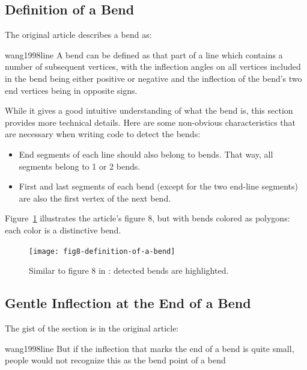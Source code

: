 \documentclass[a4paper]{article}
\begin{document}
\subsection{Definition of a Bend}
\label{sec:definition-of-a-bend}

The original article describes a bend as:

\begin{displaycquote}{wang1998line}
    A bend can be defined as that part of a line which contains a number of
    subsequent vertices, with the inflection angles on all vertices included in
    the bend being either positive or negative and the inflection of the bend's
    two end vertices being in opposite signs.
\end{displaycquote}

While it gives a good intuitive understanding of what the bend is, this section
provides more technical details. Here are some non-obvious characteristics that
are necessary when writing code to detect the bends:

\begin{itemize}
    \item End segments of each line should also belong to bends. That way, all
        segments belong to 1 or 2 bends.

    \item First and last segments of each bend (except for the two end-line
        segments) are also the first vertex of the next bend.
\end{itemize}

Figure~\ref{fig:fig8-definition-of-a-bend} illustrates the article's figure 8,
but with bends colored as polygons: each color is a distinctive bend.

\begin{figure}[ht]
    \centering
    \texttt{[image: fig8-definition-of-a-bend]}

    \caption{Similar to figure 8 in \cite{wang1998line}: detected bends are
    highlighted.}

    \label{fig:fig8-definition-of-a-bend}
\end{figure}

\subsection{Gentle Inflection at the End of a Bend}

The gist of the section is in the original article:

\begin{displaycquote}{wang1998line}
    But if the inflection that marks the end of a bend is quite small, people
    would not recognize this as the bend point of a bend
\end{displaycquote}
\end{document}
